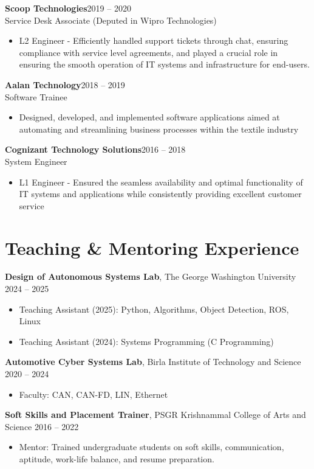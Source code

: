 \documentclass[a4paper,11pt]{article}
\begin{document}
\vspace{4pt}
\noindent
\textbf{Scoop Technologies}\hfill 2019 -- 2020 \\
Service Desk Associate (Deputed in Wipro Technologies)
\begin{itemize}
    \item L2 Engineer - Efficiently handled support tickets through chat, ensuring compliance with service level agreements, and played a crucial role in ensuring the smooth operation of IT systems and infrastructure for end-users.
\end{itemize}
\vspace{4pt}
\noindent
\textbf{Aalan Technology}\hfill 2018 -- 2019 \\
Software Trainee
\begin{itemize}
    \item Designed, developed, and implemented software applications aimed at automating and streamlining business processes within the textile industry
\end{itemize}
\vspace{4pt}
\noindent
\textbf{Cognizant Technology Solutions}\hfill 2016 -- 2018 \\
System Engineer
\begin{itemize}
    \item L1 Engineer - Ensured the seamless availability and optimal functionality of IT systems and applications while consistently providing excellent customer service
\end{itemize}


\section*{Teaching \& Mentoring Experience}
\noindent
\textbf{Design of Autonomous Systems Lab}, The George Washington University \hfill 2024 -- 2025
\begin{itemize}
    \item Teaching Assistant (2025): Python, Algorithms, Object Detection, ROS, Linux
    \item Teaching Assistant (2024): Systems Programming (C Programming)
\end{itemize}
\vspace{0.5em}
\noindent
\textbf{Automotive Cyber Systems Lab}, Birla Institute of Technology and Science \hfill 2020 -- 2024
\begin{itemize}
    \item Faculty: CAN, CAN-FD, LIN, Ethernet
\end{itemize}
\vspace{0.5em}
\noindent
\textbf{Soft Skills and Placement Trainer}, PSGR Krishnammal College of Arts and Science \hfill 2016 -- 2022
\begin{itemize}
    \item Mentor: Trained undergraduate students on soft skills, communication, aptitude, work-life balance, and resume preparation.
\end{itemize}
\end{document}
